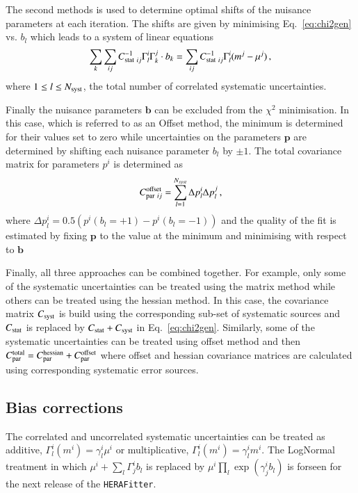 The second methods is used to determine optimal shifts of the nuisance
parameters at each iteration. The shifts are given by minimising 
Eq.~\ref{eq:chi2gen} vs. $b_l$ which leads to a system of  linear equations 
\begin{equation}
 \sum_k \sum_{ij} C^{-1}_{{\rm stat}~ij} \Gamma^i_l \Gamma^j_k \cdot b_k = \sum_{ij} C^{-1}_{{\rm stat}~ij} \Gamma^i_l (m^j - \mu^j)\,,
\end{equation}
where $1\le l \le N_{\rm syst}$, the total number of correlated systematic uncertainties.

Finally the nuisance parameters $\boldsymbol{b}$ can be excluded from the $\chi^2$ minimisation.  
In this case, which is referred to as an Offset method, the minimum is determined for their values set to zero
while uncertainties on the parameters $\boldsymbol{p}$ are determined by shifting each nuisance parameter $b_l$
by $\pm 1$. The total covariance matrix for parameters $p^i$ is determined as 
\begin{equation}
  C^{\rm offset}_{ {\rm par}~ ij} = \sum_{l=1}^{N_{syst}} \Delta p^i_l \Delta p^j_l \,,
\end{equation}
where $ \Delta p^i_l = 0.5 ( p^i( b_l = +1 ) - p^i(b_l = -1))$ and the quality of the fit is estimated by 
fixing $\boldsymbol{p}$ to the value at the minimum and minimising with respect to $\boldsymbol{b}$

Finally, all three approaches can be combined together. For example, only some of the systematic uncertainties
can be treated using the matrix method while others can be treated using the hessian method. In this case, the
covariance matrix  $C_{\rm syst}$ is build using the corresponding sub-set of systematic sources and $C_{\rm stat}$ 
is replaced by $C_{\rm stat}+C_{\rm syst}$ in Eq.~\ref{eq:chi2gen}. Similarly, some of the systematic uncertainties
can be treated using offset method and then $C^{\rm total}_{ {\rm par}} = C^{\rm hessian}_{\rm par} + C^{\rm offset}_{\rm par}$
where offset and hessian covariance matrices are calculated using corresponding systematic error sources.

\subsection{Bias corrections}

The correlated and uncorrelated systematic uncertainties can be treated as additive,  $\Gamma^i_l(m^i) = \gamma^i_l \mu^i$
or multiplicative, $\Gamma^i_l(m^i) = \gamma^i_l m^i$. The LogNormal treatment in which 
$ \mu^i + \sum_l \Gamma^i_j b_l$ is replaced by $ \mu^i \prod_l \exp( \gamma^i_j b_l) $ is forseen for the
next release of the {\tt HERAFitter}. 

